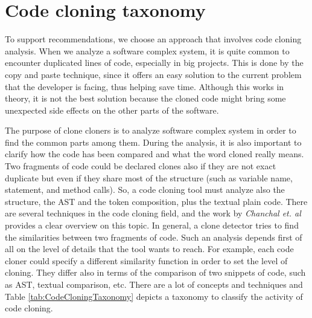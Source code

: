 


\section{Code cloning taxonomy} \label{sec:CodeClone}

To support recommendations, we choose an approach that involves code cloning 
analysis. When we analyze a software complex system, it is quite common to encounter duplicated lines of code, especially in big projects. This is done by the copy and paste technique, since it offers an 
easy solution to the current problem that the developer is facing, thus helping save time. Although this works in theory, it is not the best solution because the cloned code might bring some unexpected side effects on the other parts of the 
software. 

The purpose of clone cloners is to analyze software complex system in order to find the common parts among them. During the analysis, it is also important to clarify how the code has been compared and what the word cloned really means. Two fragments of code could be declared clones also if they are not exact duplicate but even if they share most of the structure (such as variable name, statement, and method calls). So, a code cloning tool must analyze also the structure, the AST and the token composition, plus the textual plain code. There are several techniques in the code cloning field, and the work by \emph{Chanchal et. al}~\cite{chanchal_k._roy_comparison_2009} provides a clear overview on this topic. In general, a clone detector tries to find the similarities between two fragments of code. Such an analysis depends first of all on the level of details that the tool wants to reach. For example, each code cloner could specify a different similarity function in order to set the level of cloning. They differ also in terms of the comparison of two snippets of code, such as AST, textual comparison, etc. There are a lot of concepts and techniques and Table \ref{tab:CodeCloningTaxonomy} depicts a taxonomy to classify the activity of code cloning.

